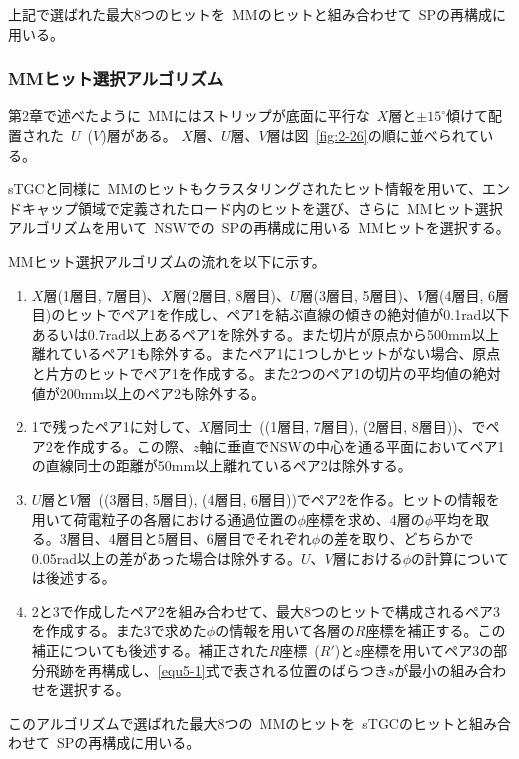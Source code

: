 上記で選ばれた最大8つのヒットを~MMのヒットと組み合わせて~SPの再構成に用いる。

\subsubsection{MMヒット選択アルゴリズム}
第2章で述べたように~MMにはストリップが底面に平行な~$X$層と$\pm15^\circ$傾けて配置された~$U$~($V$)層がある。
$X$層、$U$層、$V$層は図~\ref{fig:2-26}の順に並べられている。

sTGCと同様に~MMのヒットもクラスタリングされたヒット情報を用いて、エンドキャップ領域で定義されたロード内のヒットを選び、さらに~MMヒット選択アルゴリズムを用いて~NSWでの~SPの再構成に用いる~MMヒットを選択する。

MMヒット選択アルゴリズムの流れを以下に示す。
\begin{enumerate}
    \item $X$層(1層目, 7層目)、$X$層(2層目, 8層目)、$U$層(3層目, 5層目)、$V$層(4層目, 6層目)のヒットでペア1を作成し、ペア1を結ぶ直線の傾きの絶対値が0.1rad以下あるいは0.7rad以上あるペア1を除外する。また切片が原点から500mm以上離れているペア1も除外する。またペア1に1つしかヒットがない場合、原点と片方のヒットでペア1を作成する。また2つのペア1の切片の平均値の絶対値が200mm以上のペア2も除外する。
    \item 1で残ったペア1に対して、$X$層同士~((1層目, 7層目), (2層目, 8層目))、でペア2を作成する。この際、$z$軸に垂直でNSWの中心を通る平面においてペア1の直線同士の距離が50mm以上離れているペア2は除外する。
    \item $U$層と$V$層~((3層目, 5層目), (4層目, 6層目))でペア2を作る。ヒットの情報を用いて荷電粒子の各層における通過位置の$\phi$座標を求め、4層の$\phi$平均を取る。3層目、4層目と5層目、6層目でそれぞれ$\phi$の差を取り、どちらかで0.05rad以上の差があった場合は除外する。$U$、$V$層における$\phi$の計算については後述する。
    \item 2と3で作成したペア2を組み合わせて、最大8つのヒットで構成されるペア3を作成する。また3で求めた$\phi$の情報を用いて各層の$R$座標を補正する。この補正についても後述する。補正された$R$座標~($R'$)と$z$座標を用いてペア3の部分飛跡を再構成し、\eqref{equ5-1}式で表される位置のばらつき$s$が最小の組み合わせを選択する。
\end{enumerate}

このアルゴリズムで選ばれた最大8つの~MMのヒットを~sTGCのヒットと組み合わせて~SPの再構成に用いる。


